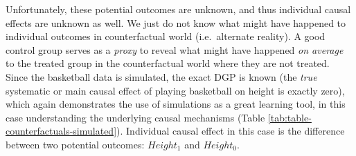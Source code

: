 \documentclass[
]{book}
\begin{document}
Unfortunately, these potential outcomes are unknown, and thus individual causal effects are unknown as well. We just do not know what might have happened to individual outcomes in counterfactual world (i.e.~alternate reality). A good control group serves as a \emph{proxy} to reveal what might have happened \emph{on average} to the treated group in the counterfactual world where they are not treated. Since the basketball data is simulated, the exact DGP is known (the \emph{true} systematic or main causal effect of playing basketball on height is exactly zero), which again demonstrates the use of simulations as a great learning tool, in this case understanding the underlying causal mechanisms (Table \ref{tab:table-counterfactuals-simulated}). Individual causal effect in this case is the difference between two potential outcomes: \(Height_{1}\) and \(Height_{0}\).
\end{document}
